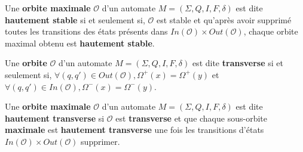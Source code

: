 \begin{Definition}
  Une \textbf{orbite maximale} \(\mathcal{O}\) d'un automate \(M = (\Sigma, Q, 
  I, F, \delta)\) est dite \textbf{hautement stable} si et seulement si, 
  \(\mathcal{O}\) est stable et qu'après avoir supprimé toutes les transitions 
  des états présents dans \(In(\mathcal{O}) \times Out(\mathcal{O})\), chaque 
  orbite maximal obtenu est \textbf{hautement stable}.
\end{Definition}

\begin{Definition}
  Une \textbf{orbite} \(\mathcal{O}\) d'un automate \(M = (\Sigma, Q, I, F, 
  \delta)\) est dite \textbf{transverse} si et seulement si, \(\forall (q, q') 
  \in Out(\mathcal{O}), \Omega^{+}(x) = \Omega^{+}(y)\) et \(\forall (q, q') \in 
  In(\mathcal{O}), \Omega^{-}(x) = \Omega^{-}(y)\).
\end{Definition}

\begin{Definition}
  Une \textbf{orbite maximale} \(\mathcal{O}\) d'un automate \(M = (\Sigma, Q, 
  I, F, \delta)\) est dite \textbf{hautement transverse} si \(\mathcal{O}\) est 
  \textbf{transverse} et que chaque sous-orbite \textbf{maximale} est 
  \textbf{hautement transverse} une fois les transitions d'états 
  \(In(\mathcal{O}) \times Out(\mathcal{O})\) supprimer.
\end{Definition}